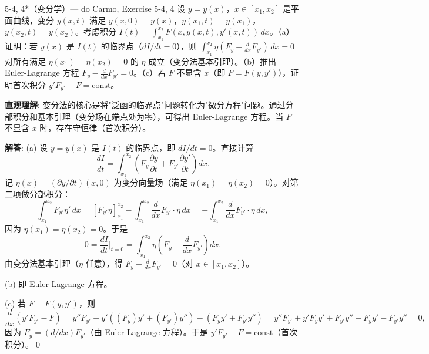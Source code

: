 \begin{exercise}{5-4, 4*（变分学）— do Carmo, Exercise 5-4, 4}
设 $y=y(x)$，$x\in[x_1,x_2]$ 是平面曲线，变分 $y(x,t)$ 满足 $y(x,0)=y(x)$，$y(x_1,t)=y(x_1)$，$y(x_2,t)=y(x_2)$。考虑积分 $I(t) = \int_{x_1}^{x_2}F(x,y(x,t),y'(x,t))\,dx$。（a）证明：若 $y(x)$ 是 $I(t)$ 的临界点（$dI/dt=0$），则 $\int_{x_1}^{x_2}\eta(F_y - \frac{d}{dx}F_{y'})\,dx = 0$ 对所有满足 $\eta(x_1)=\eta(x_2)=0$ 的 $\eta$ 成立（变分法基本引理）。（b）推出 Euler-Lagrange 方程 $F_y - \frac{d}{dx}F_{y'} = 0$。（c）若 $F$ 不显含 $x$（即 $F=F(y,y')$），证明首次积分 $y'F_{y'} - F = \mathrm{const}$。
\end{exercise}
\begin{solution}
\textbf{直观理解}: 变分法的核心是将"泛函的临界点"问题转化为"微分方程"问题。通过分部积分和基本引理（变分场在端点处为零），可得出 Euler-Lagrange 方程。当 $F$ 不显含 $x$ 时，存在守恒律（首次积分）。

\textbf{解答}: (a) 设 $y=y(x)$ 是 $I(t)$ 的临界点，即 $dI/dt = 0$。直接计算
\[
\frac{dI}{dt} = \int_{x_1}^{x_2}\left(F_y\frac{\partial y}{\partial t} + F_{y'}\frac{\partial y'}{\partial t}\right)dx.
\]
记 $\eta(x) = (\partial y/\partial t)(x,0)$ 为变分向量场（满足 $\eta(x_1)=\eta(x_2)=0$）。对第二项做分部积分：
\[
\int_{x_1}^{x_2}F_{y'}\eta'\,dx = \left[F_{y'}\eta\right]_{x_1}^{x_2} - \int_{x_1}^{x_2}\frac{d}{dx}F_{y'}\cdot\eta\,dx
= -\int_{x_1}^{x_2}\frac{d}{dx}F_{y'}\cdot\eta\,dx,
\]
因为 $\eta(x_1)=\eta(x_2)=0$。于是
\[
0 = \frac{dI}{dt}\bigg|_{t=0} = \int_{x_1}^{x_2}\eta\left(F_y - \frac{d}{dx}F_{y'}\right)dx.
\]
由变分法基本引理（$\eta$ 任意），得 $F_y - \frac{d}{dx}F_{y'} = 0$（对 $x\in[x_1,x_2]$）。

(b) 即 Euler-Lagrange 方程。

(c) 若 $F = F(y,y')$，则
\[
\frac{d}{dx}\left(y'F_{y'} - F\right) = y''F_{y'} + y'((F_y)y' + (F_{y'})y'') - (F_y y' + F_{y'}y'')
= y''F_{y'} + y'F_y y' + F_{y'}y'' - F_y y' - F_{y'}y'' = 0,
\]
因为 $F_y = (d/dx)F_{y'}$（由 Euler-Lagrange 方程）。于是 $y'F_{y'} - F = \mathrm{const}$（首次积分）。\qed
\end{solution}

